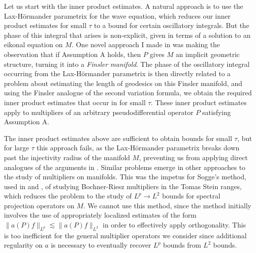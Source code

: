 \documentclass[11pt]{article}
\begin{document}
Let us start with the inner product estimates. A natural approach is to use the Lax-H\"{o}rmander parametrix for the wave equation, which reduces our inner product estimates for small $\tau$ to a bound for certain oscillatory integrals. But the phase of this integral that arises is non-explicit, given in terms of a solution to an eikonal equation on $M$. One novel aapproach I made in \cite{DensonCharacterization} was making the observation that if Assumption A holds, then $P$ gives $M$ an implicit geometric structure, turning it into a \emph{Finsler manifold}. %
The phase of the oscillatory integral occurring from the Lax-H\"{o}rmander parametrix is then directly related to a problem about estimating the length of geodesics on this Finsler manifold, and using the Finsler analogue of the second variation formula, we obtain the required inner product estimates that occur in \cite{HeoNazarovSeeger} for small $\tau$. These inner product estimates apply to multipliers of an arbitrary pseudodifferential operator $P$ satisfying Assumption A.

The inner product estimates above are sufficient to obtain bounds for small $\tau$, but for large $\tau$ this approach fails, as the Lax-H\"{o}rmander parametrix breaks down past the injectivity radius of the manifold $M$, preventing us from applying direct analogues of the arguments in \cite{HeoNazarovSeeger}. Similar problems emerge in other approaches to the study of multipliers on manifolds. This was the impetus for Sogge's method, used in \cite{SoggeRieszMeans} and \cite{KimManifold}, of studying Bochner-Riesz multipliers in the Tomas Stein ranges, which reduces the problem to the study of $L^p \to L^2$ bounds for spectral projection operators on $M$. %
We cannot use this method, since the method initially involves the use of appropriately localized estimates of the form $\| a(P) f \|_{L^p} \lesssim \| a(P) f \|_{L^2}$ in order to effectively apply orthogonality. This is too inefficient for the general multiplier operators we consider since additional regularity on $a$ is necessary to eventually recover $L^p$ bounds from $L^2$ bounds. 
\end{document}

